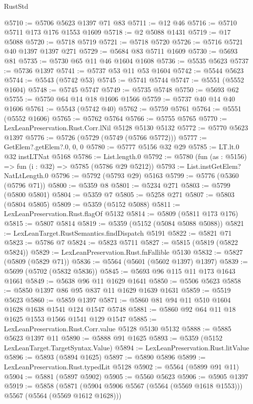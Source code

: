 \begin{lexlean}{RustStd}
\begin{coremodule}
{\begin{coremodule}
{{{{{{{{{{{{{{{{{{{{{{{{{{{{{{{{@5710 := @5706 @5623 @1397 @71 @83
@5711 := @12 @46
@5716 := @5710 @5711 @173 @176 @1553 @1609
@5718 := @2 @5088 @1431
@5719 := @17 @5088
@5720 := @5718 @5719
@5721 := @5718 @5720
@5726 := @5716 @5721 @40 @1397 @1397 @271
@5729 := @5684 @83 @5711 @1609
@5730 := @5693 @81
@5735 := @5730 @65 @11 @46 @1604 @1608
@5736 := @5535 @5623
@5737 := @5736 @1397
@5741 := @5737 @53 @11 @53 @1604
@5742 := @5544 @5623
@5744 := @5543 (@5742 @53)
@5745 := @5741 @5744
@5747 := @5551 (@5552 @1604)
@5748 := @5745 @5747
@5749 := @5735 @5748
@5750 := @5693 @62
@5755 := @5750 @64 @14 @18 @1606 @1566
@5759 := @5737 @40 @14 @40 @1606
@5761 := @5543 (@5742 @40)
@5762 := @5759 @5761
@5764 := @5551 (@5552 @1606)
@5765 := @5762 @5764
@5766 := @5755 @5765
@5770 := LexLeanPreservation.Rust.Corr.lNil @5128 @5130 @5132
@5772 := @5770 @5623 @1397
@5776 := @5726 (@5729 (@5749 (@5766 @5772)))
@5777 := GetElem?.getElem?.{0, 0, 0}
@5780 := @5777 @5156 @32 @29
@5785 := LT.lt.{0} @32 instLTNat @5168
@5786 := List.length.{0}
@5792 := @5780 (fun (as : @5156) => fun (i : @32) => @5785 (@5786 @29 @5212))
@5793 := List.instGetElem?NatLtLength.{0}
@5796 := @5792 (@5793 @29) @5163
@5799 := @5776 (@5360 (@5796 @71))
@5800 := @5359 @8
@5801 := @5234 @271
@5803 := @5799 (@5800 @5801)
@5804 := @5359 @7
@5805 := @5258 @271
@5807 := @5803 (@5804 @5805)
@5809 := @5359 (@5152 @5088)
@5811 := LexLeanPreservation.Rust.flagOf @5132
@5814 := @5809 (@5811 @173 @176)
@5815 := @5807 @5814
@5819 := @5359 (@5152 (@5084 @5088 @5088))
@5821 := LexLeanTarget.RustSemantics.findDispatch @5191
@5822 := @5821 @71
@5823 := @5786 @7
@5824 := @5823 @5711
@5827 := @5815 (@5819 (@5822 @5824))
@5829 := LexLeanPreservation.Rust.fnFallible @5130
@5832 := @5827 (@5809 (@5829 @71))
@5836 := @5564 (@5601 (@5602 @1397) @1397)
@5839 := @5699 (@5702 (@5832 @5836))
@5845 := @5693 @96 @115 @11 @173 @1643 @1661
@5849 := @5638 @96 @11 @1629 @1641
@5850 := @5506 @5623
@5858 := @5850 @1397 @86 @95 @837 @11 @1629 @1639 @1631
@5859 := @5519 @5623
@5860 := @5859 @1397
@5871 := @5860 @81 @94 @11 @510 @1604 @1628 @1638 @1541 @124 @1547 @5748
@5881 := @5860 @92 @64 @11 @18 @1625 @1553 @1566 @1541 @129 @1547
@5885 := LexLeanPreservation.Rust.Corr.value @5128 @5130 @5132
@5888 := @5885 @5623 @1397 @11
@5890 := @5888 @91 @1625
@5893 := @5359 (@5152 LexLeanTarget.TargetSyntax.Value)
@5894 := LexLeanPreservation.Rust.litValue
@5896 := @5893 (@5894 @1625)
@5897 := @5890 @5896
@5899 := LexLeanPreservation.Rust.typedLit @5128
@5902 := @5564 (@5899 @91 @11)
@5904 := @5881 (@5897 @5902)
@5905 := @5560 @5623
@5906 := @5905 @1397
@5919 := @5858
    (@5871 (@5904 @5906 @5567 (@5564 (@5569 @1618 @1553))) @5567 (@5564 (@5569 @1612 @1628)))
}}}}}}}}}}}}}}}}}}}}}}}}}}}}}}}}
\end{coremodule}}
\end{coremodule}
\end{lexlean}
